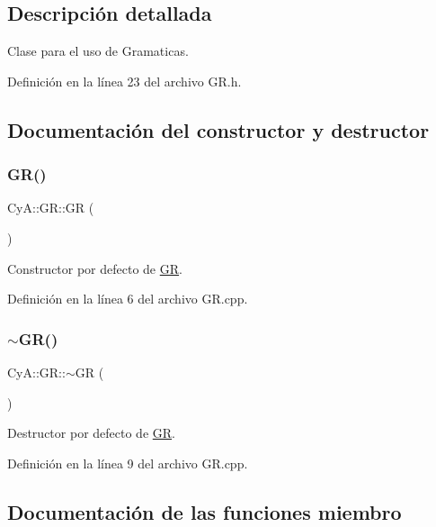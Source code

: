 \subsection{Descripción detallada}
Clase para el uso de Gramaticas. 

Definición en la línea 23 del archivo G\+R.\+h.



\subsection{Documentación del constructor y destructor}
\mbox{\label{class_cy_a_1_1_g_r_a9ff6c13befbda8a5f82ae9e30e976a2b}} 
\subsubsection{\texorpdfstring{G\+R()}{GR()}}
{\footnotesize\ttfamily Cy\+A\+::\+G\+R\+::\+GR (\begin{DoxyParamCaption}{ }\end{DoxyParamCaption})}



Constructor por defecto de \mbox{\hyperlink{class_cy_a_1_1_g_r}{GR}}. 



Definición en la línea 6 del archivo G\+R.\+cpp.

\mbox{\label{class_cy_a_1_1_g_r_afad22fec67e373f85bce6860fd19e788}} 
\subsubsection{\texorpdfstring{$\sim$\+G\+R()}{~GR()}}
{\footnotesize\ttfamily Cy\+A\+::\+G\+R\+::$\sim$\+GR (\begin{DoxyParamCaption}{ }\end{DoxyParamCaption})}



Destructor por defecto de \mbox{\hyperlink{class_cy_a_1_1_g_r}{GR}}. 



Definición en la línea 9 del archivo G\+R.\+cpp.



\subsection{Documentación de las funciones miembro}
\mbox{\label{class_cy_a_1_1_g_r_ae69828146c07258ec79c26fcc85b78f6}} 
